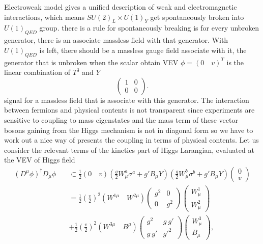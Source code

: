 \documentclass{report}
\numberwithin{equation}{section}
\begin{document}
Electroweak model gives a unified 
description of weak and electromagnetic interactions, which means $SU(2)_L\times U(1)_Y$ get spontaneously broken into $U(1)_{QED}$ group. there is a rule for spontaneously breaking is for every unbroken generator, there is an associate massless field with that generator.  With $U(1)_{QED}$ is left, there should be a massless gauge field associate with it, the generator that is unbroken when the scalar obtain VEV $\phi=(0\quad v)^T$ is the linear combination of $T^3$ and $Y$
\begin{equation}\begin{pmatrix}
    1&0\\0&0
    \end{pmatrix}.
\end{equation}
signal for a massless field that is associate with this generator.
The interaction between fermions and physical contents is not transparent since experiments are sensitive to coupling to mass eigenstates and the mass term of these vector bosons gaining from the Higgs mechanism is not in diagonal form so we have to work out a nice way of presents the coupling in terms of physical contents.
Let us consider the relevant terms of the kinetics part of Higgs Larangian, evaluated at the VEV of Higgs field
\begin{equation}
\begin{split}
(D^\mu\phi)^\dagger D_\mu\phi\quad &\subset \frac{1}{2} (0 \quad v)\left(\frac{g}{2}W^a_\mu \sigma^a+g'B_\mu Y\right)\left(\frac{g}{2}W^b_\mu \sigma^b+g'B_\mu Y\right)\begin{pmatrix}
0\\
v
\end{pmatrix}\\
&=\frac{1}{2} \left(\frac{v}{2}\right)^2(W^{1\mu} \quad W^{2 \mu})\begin{pmatrix}
g^2 & 0\\0 & g^2
\end{pmatrix}
\begin{pmatrix}
W_\mu^1 \\ W_\mu^2
\end{pmatrix}\\
&+\frac{1}{2} \left(\frac{v}{2}\right)^2(W^{3\mu} \quad B^\mu)
\begin{pmatrix}
g^2 & g\ g'\\
g\ g'& g'^2
\end{pmatrix}
\begin{pmatrix}
W_\mu^3\\
B_\mu
\end{pmatrix},
\end{split}\label{massmatrix}
\end{equation}
\end{document}
